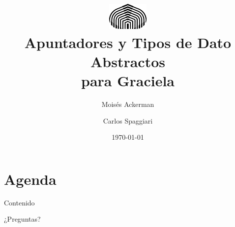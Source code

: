 \documentclass{beamer}
\title[Graciela]{\includegraphics[width=2cm]{usb} \\Apuntadores y Tipos de Dato Abstractos \\ para Graciela}
\author[Ackerman - Spaggiari]{Moisés Ackerman \and Carlos Spaggiari}
\institute[USB]{\large\bfseries{Universidad Simón Bolívar}}
\date{\today{}}
\begin{document}
\begin{frame}
  \titlepage
\end{frame}


\section*{Agenda}
\begin{frame}{Contenido}
  \tableofcontents
\end{frame}









\begin{frame}[c]{\empty}
\begin{center}
\Huge{¿Preguntas?}
\end{center}
\end{frame}
\end{document}
